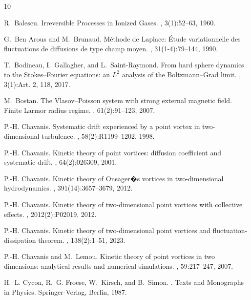\documentclass[a4paper,11pt,reqno,noindent]{amsart}
\theoremstyle{plain}
\numberwithin{equation}{section}
\newcommand{\3}{|\!|\!|}
\begin{document}
\def\cprime{$'$}\def\cprime{$'$} \def\cprime{$'$}
\begin{thebibliography}{10}

R.~Balescu.
\newblock Irreversible {P}rocesses in {I}onized {G}ases.
, 3(1):52--63, 1960.

G.~{Ben Arous} and M.~Brunaud.
\newblock M\'ethode de {L}aplace: {\'E}tude variationnelle des fluctuations de
  diffusions de type champ moyen.
, 31(1-4):79--144, 1990.

T.~Bodineau, I.~Gallagher, and L.~Saint-Raymond.
\newblock From hard sphere dynamics to the {S}tokes--{F}ourier equations: an
  {$L^2$} analysis of the {B}oltzmann--{G}rad limit.
, 3(1):Art. 2, 118, 2017.

M.~Bostan.
\newblock The {V}lasov--{P}oisson system with strong external magnetic field.
  {F}inite {L}armor radius regime.
, 61(2):91--123, 2007.

P.-H. Chavanis.
\newblock Systematic drift experienced by a point vortex in two-dimensional
  turbulence.
, 58(2):R1199--1202, 1998.

P.-H. Chavanis.
\newblock Kinetic theory of point vortices: diffusion coefficient and
  systematic drift.
, 64(2):026309, 2001.

P.-H. Chavanis.
\newblock Kinetic theory of {O}nsager�s vortices in two-dimensional
  hydrodynamics.
, 391(14):3657--3679, 2012.

P.-H. Chavanis.
\newblock Kinetic theory of two-dimensional point vortices with collective
  effects.
, 2012(2):P02019, 2012.

P.-H. Chavanis.
\newblock Kinetic theory of two-dimensional point vortices and
  fluctuation-dissipation theorem.
, 138(2):1--51, 2023.

P.-H. Chavanis and M.~Lemou.
\newblock Kinetic theory of point vortices in two dimensions: analytical
  results and numerical simulations.
, 59:217--247, 2007.

H.~L. Cycon, R.~G. Froese, W.~Kirsch, and B.~Simon.
.
\newblock Texts and Monographs in Physics. Springer-Verlag, Berlin, 1987.


\end{thebibliography}
\end{document}
